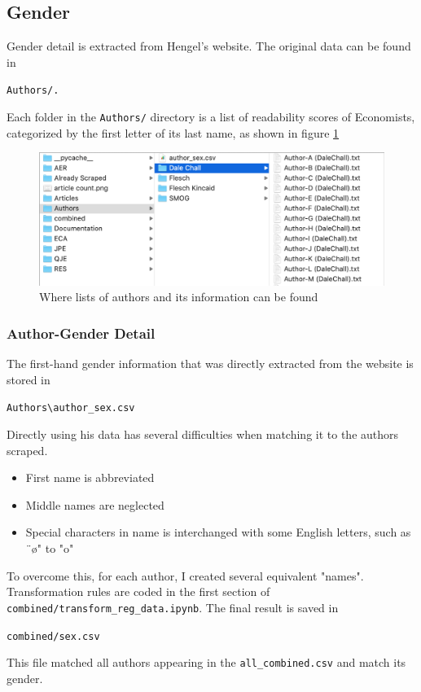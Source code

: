 %
%
%
%
%
%

\subsection{Gender}

Gender detail is extracted from Hengel's website. The original data can be found in 
\begin{center}
    \verb|Authors/.|
\end{center}

Each folder in the \verb|Authors/| directory is a list of readability scores of Economists, categorized by the first letter of its last name, as shown in figure \ref{fig:author_list}
\begin{figure}[h]
    \centering
    \includegraphics[width = 0.5 \textwidth]{IMG/author files.png}
    \caption{Where lists of authors and its information can be found}
    \label{fig:author_list}
\end{figure}

\subsubsection*{Author-Gender Detail}

The first-hand gender information that was directly extracted from the website is stored in 
\begin{center}
    \verb|Authors\author_sex.csv|
\end{center}

Directly using his data has several difficulties when matching it to the authors scraped. 
\begin{itemize}
    \item First name is abbreviated
    \item Middle names are neglected
    \item Special characters in name is interchanged with some English letters, such as ¨ø" to "o"
\end{itemize}

To overcome this, for each author, I created several equivalent "names". Transformation rules are coded in the first section of \verb|combined/transform_reg_data.ipynb|.
The final result is saved in 
\begin{center}
    \verb|combined/sex.csv|
\end{center}
This file matched all authors appearing in the \verb|all_combined.csv| and match its gender. 

